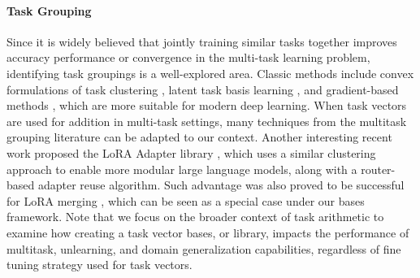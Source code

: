 \paragraph{Task Grouping}
Since it is widely believed that jointly training similar tasks together improves accuracy performance or convergence \citep{caruana1993multitask} in the multi-task learning problem, identifying task groupings is a well-explored area. Classic methods include convex formulations of task clustering \citep{jacob2008clustered}, latent task basis learning \citep{kumar2012learning}, and gradient-based methods \citep{fifty2021efficiently}, which are more suitable for modern deep learning. When task vectors are used for addition in multi-task settings, many techniques from the multitask grouping literature can be adapted to our context. Another interesting recent work proposed the LoRA \citep{hu2021lora} Adapter library \citep{ostapenko2024towards}, which uses a similar clustering approach to enable more modular large language models, along with a router-based adapter reuse algorithm. Such advantage was also proved to be successful for LoRA merging \citep{zhao2024merging}, which can be seen as a special case under our bases framework. Note that we focus on the broader context of task arithmetic to examine how creating a task vector bases, or library, impacts the performance of multitask, unlearning, and domain generalization capabilities, regardless of fine tuning strategy used for task vectors. 